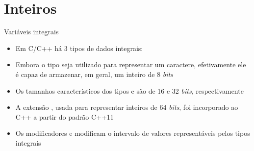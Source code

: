 \section{Inteiros}

\begin{frame}[fragile]{Variáveis integrais}

    \begin{itemize}
        \item Em C/C++ há 3 tipos de dados integrais: 

        \item Embora o tipo  seja utilizado para representar um caractere,
            efetivamente ele é capaz de armazenar, em geral, um inteiro de 8 \textit{bits}

        \item Os tamanhos característicos dos tipos  e  são
            de 16 e 32 \textit{bits}, respectivamente

        \item A extensão , usada para representar inteiros de 64 
            \textit{bits}, foi incorporado ao C++ a partir do padrão C++11

        \item Os modificadores  e  modificam o intervalo
            de valores representáveis pelos tipos integrais
    \end{itemize}

\end{frame}


